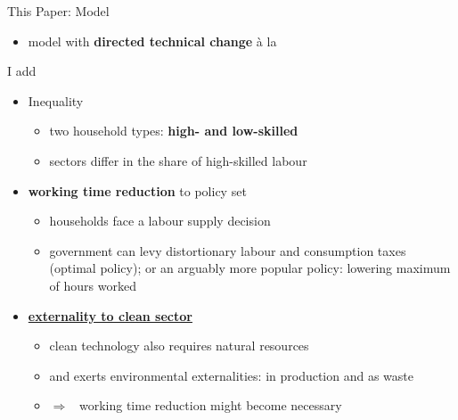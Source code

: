 \documentclass[11pt,aspectratio=169]{beamer}
\newcommand{\tr}[1]{\textcolor{blue}{#1}}
\newcommand{\ar}{$\Rightarrow$ \ }
\begin{document}
\begin{frame}{This Paper: Model}
	\begin{itemize}
\item model with \textbf{\alert{directed technical change}}  à la \cite{Acemoglu2012TheChange}
\end{itemize}
\pause
I add 
\begin{itemize}
\item<+-> Inequality
\begin{itemize}
\item two household types: \textbf{\alert{high- and low-skilled}}
\item sectors differ in the share of high-skilled labour 
\end{itemize}
\item<+-> \alert{\textbf{working time reduction}} to policy set
\begin{itemize}
\item households face a labour supply decision
\item government can levy distortionary labour and consumption taxes (optimal policy); or an arguably more popular policy: lowering maximum of hours worked
\end{itemize}

\item<+-> %
 \hyperlink{cleanSec}{\textbf{\alert{externality to clean sector}} }
\begin{itemize}
	\item clean technology also requires natural resources
	\item and exerts environmental externalities: in production and as waste
	\item[] \ar working time reduction might become necessary %
\end{itemize}
	\end{itemize}
\end{frame}
\end{document}
